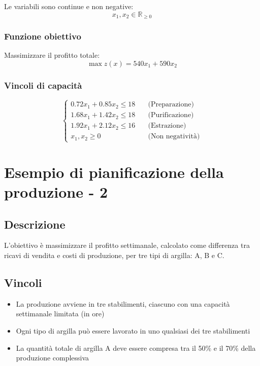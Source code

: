 Le variabili sono continue e non negative:
\begin{equation}
x_1, x_2 \in \mathbb{R}_{\geq 0}
\end{equation}

\subsubsection{Funzione obiettivo}
Massimizzare il profitto totale:
\begin{equation}
\max z(x) = 540x_1 + 590x_2
\end{equation}

\subsubsection{Vincoli di capacità}

\[
\begin{cases}
0.72x_1 + 0.85x_2 \leq 18 \quad &\text{(Preparazione)} \\
1.68x_1 + 1.42x_2 \leq 18 \quad &\text{(Purificazione)} \\
1.92x_1 + 2.12x_2 \leq 16 \quad &\text{(Estrazione)} \\
x_1, x_2 \geq 0 \quad &\text{(Non negatività)}
\end{cases}
\]


\section{Esempio di pianificazione della produzione - 2}

\subsection{Descrizione}
L'obiettivo è massimizzare il profitto settimanale, calcolato come differenza tra ricavi di vendita e costi di produzione, per tre tipi di argilla: A, B e C.

\subsection{Vincoli}
\begin{itemize}
    \item La produzione avviene in tre stabilimenti, ciascuno con una capacità settimanale limitata (in ore)
    \item Ogni tipo di argilla può essere lavorato in uno qualsiasi dei tre stabilimenti
    \item La quantità totale di argilla A deve essere compresa tra il 50\% e il 70\% della produzione complessiva
\end{itemize}

